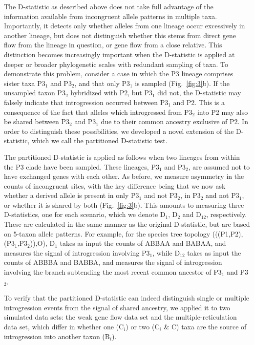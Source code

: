 \documentclass[12pt,letterpaper]{article}
\begin{document}
The D-statistic as described above does not take full advantage of the
information available from incongruent allele patterns in multiple
taxa. Importantly, it detects only whether alleles from one lineage
occur excessively in another lineage, but does not distinguish whether
this stems from direct gene flow from the lineage in question, or gene
flow from a close relative.
This distinction becomes increasingly important when the D-statistic
is applied at deeper or broader phylogenetic scales with redundant
sampling of taxa.
To demonstrate this problem, consider a case in which the P3 lineage
comprises sister taxa P3$_1$ and P3$_2$, and that only P3$_1$ is
sampled (Fig.~\ref{fig:3}b). If the unsampled taxon P3$_2$ hybridized
with P2, but P3$_1$ did
not, the D-statistic may falsely indicate that introgression occurred
between P3$_1$ and P2. This is a consequence of the fact that alleles
which introgressed from P3$_2$ into P2 may also be shared between
P3$_2$ and P3$_1$ due to their common ancestry exclusive of P2. In
order to distinguish these possibilities, we developed a novel
extension of the D-statistic, which we call the partitioned
D-statistic test.

The partitioned D-statistic is applied as follows when two lineages
from within the P3 clade have been sampled. These lineages, P3$_1$ and
P3$_2$, are assumed not to have exchanged genes with each other. As
before, we measure asymmetry in the counts of incongruent sites, with
the key difference being that we now ask whether a derived allele is
present in only P3$_1$ and not P3$_2$, in P3$_2$ and not P3$_1$, or
whether it is shared by both (Fig.~\ref{fig:3}b). This amounts to
measuring three D-statistics, one for each scenario, which we denote
D$_1$, D$_2$ and D$_{12}$, respectively. These are calculated in the
same manner as the original D-statistic, but are based on 5-taxon
allele patterns. For example, for the species tree topology
(((P1,P2),(P3$_1$,P3$_2$)),O), D$_{1}$ takes as input the counts of
ABBAA and BABAA, and measures the signal of introgression involving 
P3$_1$, while D$_{12}$ takes as input the counts of ABBBA and BABBA,
and measures the signal of introgression involving the branch subtending
the most recent common ancestor of P3$_1$ and P3$_2$.

To verify that the partitioned D-statistic can indeed distinguish
single or multiple introgression events from the signal of shared
ancestry, we applied it to two simulated data sets: the weak gene flow
data set and the multiple-reticulation data set, which differ in
whether one (C$_i$) or two (C$_i$ \& C) taxa are the source of
introgression into another taxon (B$_i$).
\end{document}
